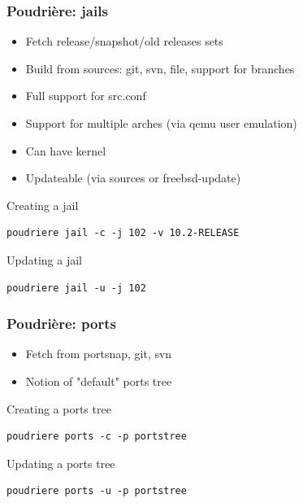 \begin{frame}[fragile]
	\frametitle{Poudrière: jails}
	\begin{itemize}
			\pause
		\item Fetch release/snapshot/old releases sets
			\pause
		\item Build from sources: git, svn, file, support for branches
			\pause
		\item Full support for src.conf
			\pause
		\item Support for multiple arches (via qemu user emulation)
			\pause
		\item Can have kernel
			\pause
		\item Updateable (via sources or freebsd-update)
	\end{itemize}
	\pause
	Creating a jail
	\begin{lstlisting}
poudriere jail -c -j 102 -v 10.2-RELEASE
\end{lstlisting}
	\pause
	Updating a jail
	\begin{lstlisting}
poudriere jail -u -j 102
\end{lstlisting}
\end{frame}

\begin{frame}[fragile]
	\frametitle{Poudrière: ports}
	\begin{itemize}
			\pause
		\item Fetch from portsnap, git, svn
			\pause
		\item Notion of "default" ports tree
			\pause
	\end{itemize}
	\pause
	Creating a ports tree
	\begin{lstlisting}
poudriere ports -c -p portstree
\end{lstlisting}
	\pause
	Updating a ports tree
	\begin{lstlisting}
poudriere ports -u -p portstree
\end{lstlisting}
\end{frame}

